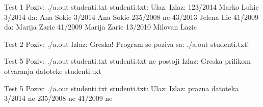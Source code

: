 \begin{Exercise}[label=609]
\noindent
\begin{maxitest}
\begin{test}{Test 1}
Poziv: ./a.out studenti.txt
studenti.txt:                  Ulaz:            Izlaz:
123/2014 Marko Lukic           3/2014           da: Ana Sokic
3/2014   Ana Sokic             235/2008         ne
43/2013  Jelena Ilic           41/2009          da: Marija Zaric
41/2009  Marija Zaric
13/2010  Milovan Lazic
\end{test}
\end{maxitest}
\begin{miditest}
\begin{test}{Test 2}
Poziv: ./a.out
Izlaz: 
  Greska! Program se poziva sa: 
  ./a.out studenti.txt!
\end{test}
\end{miditest}
\begin{miditest}
\begin{test}{Test 5}
Poziv: ./a.out  studenti.txt
studenti.txt ne postoji
Izlaz: 
  Greska prilikom otvaranja 
  datoteke studenti.txt
\end{test}
\end{miditest}	
\begin{maxitest}
\begin{test}{Test 5}
Poziv: ./a.out  studenti.txt
studenti.txt:                  Ulaz:            Izlaz:
  prazna datoteka              3/2014           ne
                               235/2008         ne
                               41/2009          ne
\end{test}
\end{maxitest}
\end{Exercise}
\begin{Answer}[ref=609]
\end{Answer}

